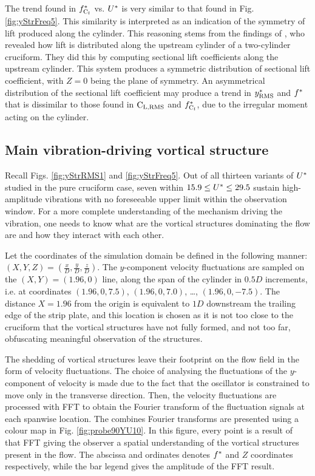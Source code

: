 \documentclass[oneside]{utmthesis}
\begin{document}
The trend found in $f_{\text{C}_{l}}^{*}$ vs. $U^{*}$ is very similar to that found in Fig. \ref{fig:yStrFreq5}. This similarity is interpreted as an indication of the symmetry of lift produced along the cylinder. This reasoning stems from the findings of \citet{Zhao2018a}, who revealed how lift is distributed along the upstream cylinder of a two-cylinder \angfi{} cruciform. They did this by computing sectional lift coefficients along the upstream cylinder. This system produces a symmetric distribution of sectional lift coefficient, with $Z = 0$ being the plane of symmetry. An asymmetrical distribution of the sectional lift coefficient may produce a trend in $y^{*}_{\text{RMS}}$ and $f^{*}$ that is dissimilar to those found in $\text{C}_{\text{L,RMS}}$ and $f_{\text{C}_{l}}^{*}$, due to the irregular moment acting on the cylinder.

\subsection{Main vibration-driving vortical structure}\label{ssec:svivRegimeVortStruct}
Recall Figs. \ref{fig:yStrRMS1} and \ref{fig:yStrFreq5}. Out of all thirteen variants of $U^{*}$ studied in the pure cruciform case, seven within $15.9 \leq U^{*} \leq 29.5$ sustain high-amplitude vibrations with no foreseeable upper limit within the observation window. For a more complete understanding of the mechanism driving the vibration, one needs to know what are the vortical structures dominating the flow are and how they interact with each other.

Let the coordinates of the simulation domain be defined in the following manner: $\left( X, Y, Z \right) = \left( \frac{x}{D}, \frac{y}{D}, \frac{z}{D} \right)$. The $y$-component velocity fluctuations are sampled on the $\left ( X, Y \right ) = \left ( 1.96, 0 \right )$ line, along the span of the cylinder in $0.5D$ increments, i.e. at coordinates $\left ( 1.96, 0, 7.5 \right )$, $\left ( 1.96, 0, 7.0 \right )$, \dots, $\left ( 1.96, 0, -7.5 \right )$. The distance $X = 1.96$ from the origin is equivalent to $1D$ downstream the trailing edge of the strip plate, and this location is chosen as it is not too close to the cruciform that the vortical structures have not fully formed, and not too far, obfuscating meaningful observation of the structures.

The shedding of vortical structures leave their footprint on the flow field in the form of velocity fluctuations. The choice of analysing the fluctuations of the $y$-component of velocity is made due to the fact that the oscillator is constrained to move only in the transverse direction. Then, the velocity fluctuations are processed with FFT to obtain the Fourier transform of the fluctuation signals at each spanwise location. The combines Fourier transforms are presented using a colour map in Fig. \ref{fig:probe90YU10}. In this figure, every point is a result of that FFT giving the observer a spatial understanding of the vortical structures present in the flow. The abscissa and ordinates denotes $f^{*}$ and $Z$ coordinates respectively, while the bar legend gives the amplitude of the FFT result.
\end{document}
